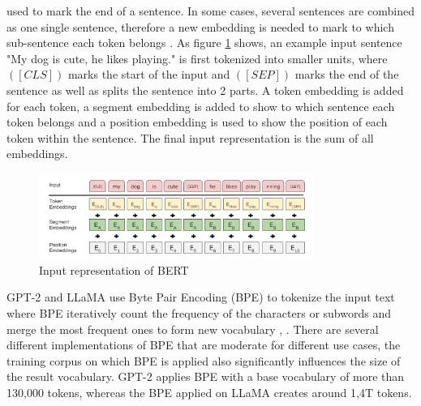 \documentclass[runningheads]{llncs}
\begin{document}
used to mark the end of a sentence. In some cases, several sentences are combined as one single sentence, therefore a new embedding is needed to mark to which sub-sentence each token belongs \cite{Devlin18}.
As figure \ref{fig:bert_input} shows, an example input sentence "My dog is cute, he likes playing." is first tokenized into smaller units, where $([CLS])$ marks the start of the input and 
$([SEP])$ marks the end of the sentence as well as splits the sentence into 2 parts. A token embedding is added for each token, a segment embedding is added to show to which sentence each token belongs and
a position embedding is used to show the position of each token within the sentence. The final input representation is the sum of all embeddings.
\begin{figure}[H]
  \centering
  \includegraphics[width=0.8\textwidth]{BERT input repres.png}
  \caption{Input representation of BERT \cite{Devlin18}}
  \label{fig:bert_input}
\end{figure}

\noindent \newline
GPT-2 and LLaMA use Byte Pair Encoding (BPE) \cite{Sennrich15} to tokenize the input text where BPE iteratively count the frequency of the characters or subwords and merge the most frequent ones
to form new vocabulary \cite{Radford19}, \cite{Touvron23}. There are several different implementations of BPE that are moderate for different use cases, the training corpus on which BPE is applied also
significantly influences the size of the result vocabulary. GPT-2 applies BPE with a base vocabulary of more than 130,000 tokens, whereas the BPE applied on LLaMA creates around 1,4T tokens.
\end{document}
